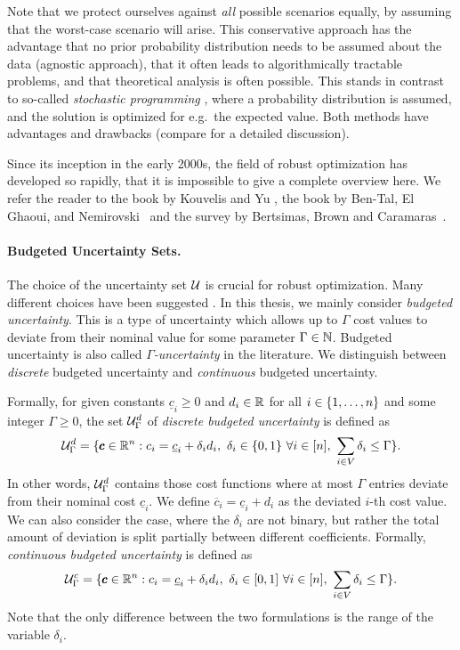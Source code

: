 Note that we protect ourselves against \emph{all} possible scenarios equally, by assuming that the worst-case scenario will arise. This conservative approach has the advantage that no prior probability distribution needs to be assumed about the data (agnostic approach), that it often leads to algorithmically tractable problems, and that theoretical analysis is often possible. This stands in contrast to so-called \emph{stochastic programming} \cite{birge2011introduction}, where a probability distribution is assumed, and the solution is optimized for e.g.\ the expected value. Both methods have advantages and drawbacks (compare \cite{ben2009robust} for a detailed discussion).  
 
Since its inception in the early 2000s, the field of robust optimization has developed so rapidly, that it is impossible to give a complete overview here. We refer the reader to the book by Kouvelis and Yu \cite{kouvelis2013robust}, the book by Ben-Tal, El Ghaoui, and Nemirovski~\cite{ben2009robust} and the survey by Bertsimas, Brown and Caramaras~\cite{bertsimas2011theory}. 

\paragraph*{Budgeted Uncertainty Sets.}
The choice of the uncertainty set $\mathcal{U}$ is crucial for robust optimization. Many different choices have been suggested \cite{poss2018robust,busing2012new,bertsimas2004robust,kasperski2016robust}. In this thesis, we mainly consider \emph{budgeted uncertainty}. This is a type of uncertainty which allows up to $\Gamma$ cost values to deviate from their nominal value for some parameter $\Gamma \in \mathbb{N}$. Budgeted uncertainty is also called \emph{$\Gamma$-uncertainty} in the literature. We distinguish between \emph{discrete} budgeted uncertainty and \emph{continuous} budgeted uncertainty.

Formally, for given constants $\underline{c}_i \geq 0$ and $d_i \in \mathbb{R}$ for all $i \in \{ 1, \ldots, n \}$ and some integer $\Gamma \geq 0$, the set $\mathcal{U}^d_\Gamma$ of \emph{discrete budgeted uncertainty} is defined as
\[
\mathcal{U}^d_\Gamma = \{  \pmb c \in \mathbb{R}^n : c_i = \underline{c}_i + \delta_id_i,\  \delta_i \in \{ 0,1 \}\ \forall i \in [n],\ \sum_{i \in V}\delta_i \leq \Gamma  \}.
\]
In other words, $\mathcal{U}^d_\Gamma$ contains those cost functions where at most $\Gamma$ entries deviate from their nominal cost $\underline{c}_i$. We define $\overline{c}_i = \underline{c}_i + d_i$ as the deviated $i$-th cost value. We can also consider the case, where the $\delta_i$ are not binary, but rather the total amount of deviation is split partially between different coefficients. Formally, \emph{continuous budgeted uncertainty} is defined as
\[
\cU^c_\Gamma = \set{ \pmb c \in \R^n : c_i = \underline{c}_i + \delta_id_i,\  \delta_i \in [0,1]\ \forall i \in [n],\ \sum_{i \in V}\delta_i \leq \Gamma }.
\]
Note that the only difference between the two formulations is the range of the variable $\delta_i$.

